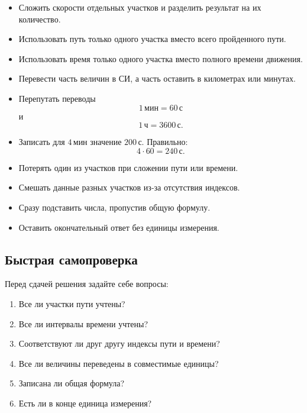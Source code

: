 \documentclass[a4paper,12pt]{article}
\newcommand{\unit}[1]{\,\text{#1}}
\begin{document}
\begin{itemize}

\item
Сложить скорости отдельных участков и разделить результат на их количество.

\item
Использовать путь только одного участка вместо всего пройденного пути.

\item
Использовать время только одного участка вместо полного времени движения.

\item
Перевести часть величин в СИ, а часть оставить в километрах или минутах.

\item
Перепутать переводы
\[
1\unit{мин}=60\unit{с}
\]
и
\[
1\unit{ч}=3600\unit{с}.
\]

\item
Записать для
$4\unit{мин}$
значение
$200\unit{с}$.
Правильно:
\[
4\cdot60=240\unit{с}.
\]

\item
Потерять один из участков при сложении пути или времени.

\item
Смешать данные разных участков из-за отсутствия индексов.

\item
Сразу подставить числа, пропустив общую формулу.

\item
Оставить окончательный ответ без единицы измерения.

\end{itemize}

\subsection*{Быстрая самопроверка}

Перед сдачей решения задайте себе вопросы:

\begin{enumerate}

\item
Все ли участки пути учтены?

\item
Все ли интервалы времени учтены?

\item
Соответствуют ли друг другу индексы пути и времени?

\item
Все ли величины переведены в совместимые единицы?

\item
Записана ли общая формула?

\item
Есть ли в конце единица измерения?

\end{enumerate}
\end{document}
